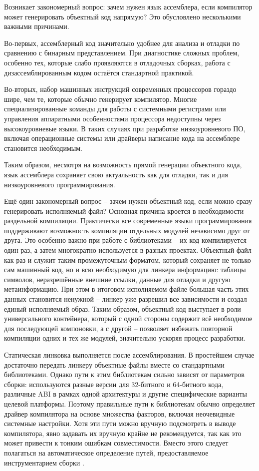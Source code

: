 Возникает закономерный вопрос: зачем нужен язык ассемблера, если компилятор может генерировать объектный код напрямую? Это обусловлено несколькими важными причинами.

Во-первых, ассемблерный код значительно удобнее для анализа и отладки по сравнению с бинарным представлением. При диагностике сложных проблем, особенно тех, которые слабо проявляются в отладочных сборках, работа с дизассемблированным кодом остаётся стандартной практикой.

Во-вторых, набор машинных инструкций современных процессоров гораздо шире, чем те, которые обычно генерирует компилятор. Многие специализированные команды  для работы с системными регистрами или управления аппаратными особенностями процессора недоступны через высокоуровневые языки. В таких случаях при разработке низкоуровневого ПО, включая операционные системы или драйверы написание кода на ассемблере становится необходимым.

Таким образом, несмотря на возможность прямой генерации объектного кода, язык ассемблера сохраняет свою актуальность как для отладки, так и для низкоуровневого программирования.

Ещё один закономерный вопрос -- зачем нужен объектный код, если можно сразу генерировать исполняемый файл? Основная причина кроется в необходимости раздельной компиляции. Практически все современные языки программирования поддерживают возможность компиляции отдельных модулей независимо друг от друга. Это особенно важно при работе с библиотеками -- их код компилируется один раз, а затем многократно используется в разных проектах. Объектный файл как раз и служит таким промежуточным форматом, который сохраняет не только сам машинный код, но и всю необходимую для линкера информацию: таблицы символов, неразрешённые внешние ссылки, данные для отладки и другую метаинформацию. При этом в итоговом исполняемом файле большая часть этих данных становится ненужной -- линкер уже разрешил все зависимости и создал единый исполняемый образ. Таким образом, объектный код выступает в роли универсального контейнера, который с одной стороны содержит всё необходимое для последующей компоновки, а с другой -- позволяет избежать повторной компиляции одних и тех же модулей, значительно ускоряя процесс разработки.

Статическая линковка выполняется после ассемблирования. В простейшем случае достаточно передать линкеру объектные файлы вместе со стандартными библиотеками. Однако пути к этим библиотекам сильно зависят от параметров сборки: используются разные версии для 32-битного и 64-битного кода, различные ABI в рамках одной архитектуры и другие специфические варианты целевой платформы. Поэтому правильные пути к библиотекам обычно определяет драйвер компилятора на основе множества факторов, включая неочевидные системные настройки. Хотя эти пути можно вручную подсмотреть в выводе компилятора, явно задавать их вручную крайне не рекомендуется, так как это может привести к тонким ошибкам совместимости. Вместо этого следует полагаться на автоматическое определение путей, предоставляемое инструментарием сборки \cite{Vladimirov2024}.

